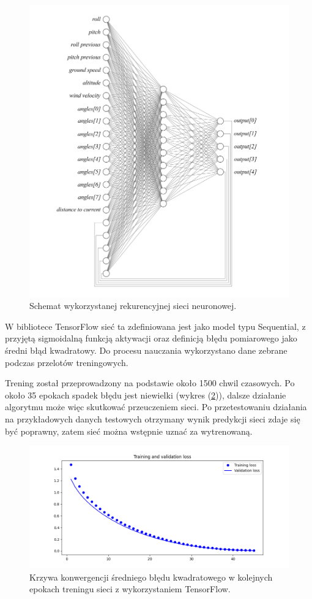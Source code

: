 \documentclass[12pt, a4paper]{article}
\let\oldref\ref
\renewcommand{\ref}[1]{(\oldref{#1})}
\begin{document}
 \begin{figure}[H]
    \centering
    \includegraphics[width=1\textwidth]{siec}
    \caption{Schemat wykorzystanej rekurencyjnej sieci neuronowej.}
    \label{fig:siec}
\end{figure}

W bibliotece TensorFlow sieć ta zdefiniowana jest jako model typu Sequential, z przyjętą sigmoidalną funkcją aktywacji oraz definicją błędu pomiarowego jako średni błąd kwadratowy. Do procesu nauczania wykorzystano dane zebrane podczas przelotów treningowych.

Trening został przeprowadzony na podstawie około 1500 chwil czasowych. Po około 35 epokach spadek błędu jest niewielki (wykres \ref{fig:tren1}), dalsze działanie algorytmu może więc skutkować przeuczeniem sieci. Po przetestowaniu działania na przykładowych danych testowych otrzymany wynik predykcji sieci zdaje się być poprawny, zatem sieć można wstępnie uznać za wytrenowaną.

 \begin{figure}[H]
    \centering
    \includegraphics[width=1\textwidth]{tfloss}
    \caption{Krzywa konwergencji średniego błędu kwadratowego w kolejnych epokach treningu sieci z wykorzystaniem TensorFlow.}
    \label{fig:tren1}
\end{figure}
\end{document}
